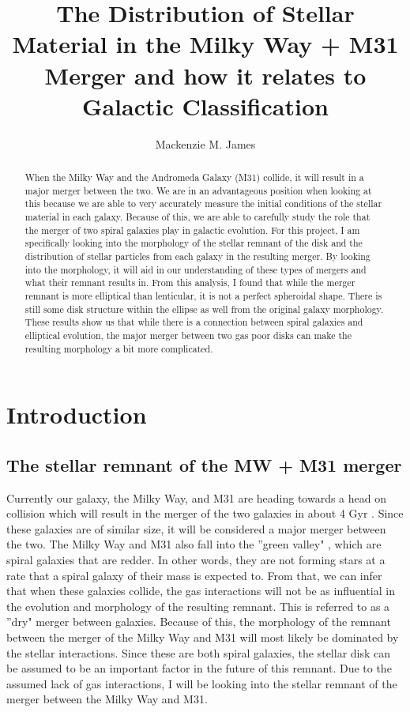 \documentclass{aastex63}
\begin{document}
\title{The Distribution of Stellar Material in the Milky Way + M31 Merger and how it relates to Galactic Classification}

\author{Mackenzie M. James}



\begin{abstract}
    When the Milky Way and the Andromeda Galaxy (M31) collide, it will result in a major merger between the two. We are in an advantageous position when looking at this because we are able to very accurately measure the initial conditions of the stellar material in each galaxy. Because of this, we are able to carefully study the role that the merger of two spiral galaxies play in galactic evolution. For this project, I am specifically looking into the morphology of the stellar remnant of the disk and the distribution of stellar particles from each galaxy in the resulting merger. By looking into the morphology, it will aid in our understanding of these types of mergers and what their remnant results in. From this analysis, I found that while the merger remnant is more elliptical than lenticular, it is not a perfect spheroidal shape. There is still some disk structure within the ellipse as well from the original galaxy morphology. These results show us that while there is a connection between spiral galaxies and elliptical evolution, the major merger between two gas poor disks can make the resulting morphology a bit more complicated.
\end{abstract}

\section{Introduction}

\subsection{The stellar remnant of the MW + M31 merger}
Currently our galaxy, the Milky Way, and M31 are heading towards a head on collision which will result in the merger of the two galaxies in about 4 Gyr \citep{2012ApJ...753....9V}. Since these galaxies are of similar size, it will be considered a major merger between the two. The Milky Way and M31 also fall into the ''green valley" \citep{2011ApJ...736...84M}, which are spiral galaxies that are redder. In other words, they are not forming stars at a rate that a spiral galaxy of their mass is expected to. From that, we can infer that when these galaxies collide, the gas interactions will not be as influential in the evolution and morphology of the resulting remnant. This is referred to as a ''dry" merger between galaxies. Because of this, the morphology of the remnant between the merger of the Milky Way and M31 will most likely be dominated by the stellar interactions. Since these are both spiral galaxies, the stellar disk can be assumed to be an important factor in the future of this remnant. Due to the assumed lack of gas interactions, I will be looking into the stellar remnant of the merger between the Milky Way and M31.
\end{document}
